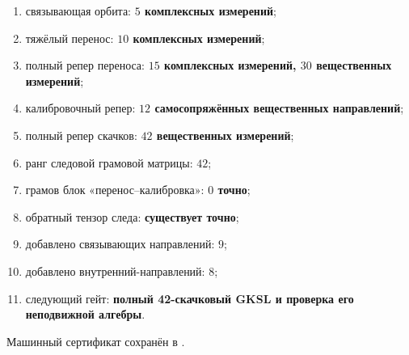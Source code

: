 \begin{protocol}
\begin{enumerate}
 \item связывающая орбита: \textbf{$5$ комплексных измерений};
 \item тяжёлый перенос: \textbf{$10$ комплексных измерений};
 \item полный репер переноса: \textbf{$15$ комплексных измерений, $30$ вещественных измерений};
 \item калибровочный репер: \textbf{$12$ самосопряжённых вещественных направлений};
 \item полный репер скачков: \textbf{$42$ вещественных измерений};
 \item ранг следовой грамовой матрицы: \textbf{$42$};
 \item грамов блок «перенос--калибровка»: \textbf{$0$ точно};
 \item обратный тензор следа: \textbf{существует точно};
 \item добавлено связывающих направлений: \textbf{$9$};
 \item добавлено внутренний-направлений: \textbf{$8$};
 \item следующий гейт: \textbf{полный 42-скачковый GKSL и проверка его
       неподвижной алгебры}.
\end{enumerate}
\end{protocol}

Машинный сертификат сохранён в
.